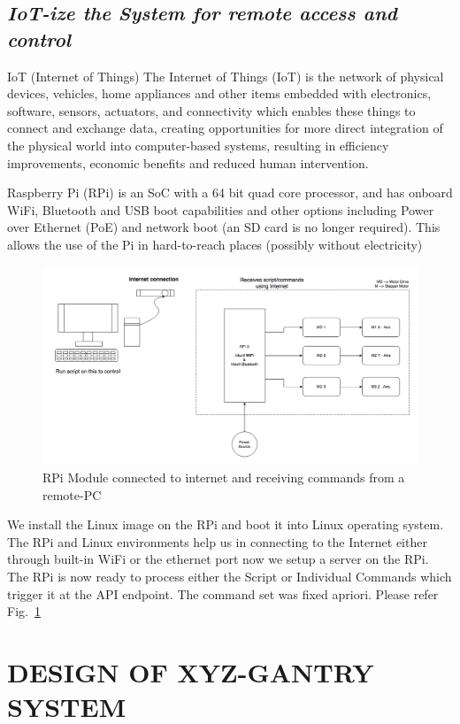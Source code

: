 \documentclass[MTech]{iitmdiss}
\begin{document}
\subsection{\emph{IoT-ize the System for remote access and control
}}

IoT (Internet of Things) The Internet of Things (IoT) is the network of physical devices, vehicles, home appliances and other items embedded with electronics, software, sensors, actuators, and connectivity which enables these things to connect and exchange data, creating opportunities for more direct integration of the physical world into computer-based systems, resulting in efficiency improvements, economic benefits and reduced human intervention.

Raspberry Pi (RPi) is an SoC with a 64 bit quad core processor, and has onboard WiFi, Bluetooth and USB boot capabilities and other options including Power over Ethernet (PoE) and network boot (an SD card is no longer required). This allows the use of the Pi in hard-to-reach places (possibly without electricity)

\begin{figure}[h!]
	\includegraphics[width=\linewidth]{ffigures/rpi_diag}
	\caption{RPi Module connected to internet and receiving commands from a remote-PC}
	\label{rpi1}
\end{figure}

We install the Linux image on the RPi and boot it into Linux operating system. The RPi and Linux environments help us in connecting to the Internet either through built-in WiFi or the ethernet port now we setup a server on the RPi. The RPi is now ready to process either the Script or Individual Commands which trigger it at the API endpoint. The command set was fixed apriori. Please refer Fig.~\ref{rpi1}


\section{DESIGN OF XYZ-GANTRY SYSTEM}
\end{document}
